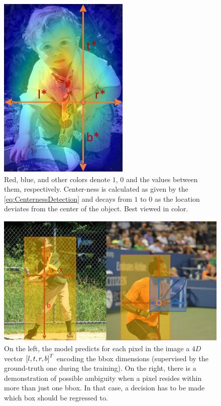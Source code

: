 \begin{figure}[t]
    \centerline{\includegraphics[width=0.25\linewidth]{figures/theoretical_foundations/fcos_centerness.pdf}}
    \caption[Centerness visualization]{Red, blue, and other colors denote $1$, $0$ and the values between them, respectively. Center-ness is calculated as given by the \cref{eq:CenternessDetection} and decays from $1$ to $0$ as the location deviates from the center of the object. Best viewed in color. }
    \label{fig:FCOSCenterness}
\end{figure}

\begin{figure}[t]
    \centerline{\includegraphics[width=0.6\linewidth]{figures/theoretical_foundations/fcos_detection_demo.pdf}}
    \caption[\Gls{fcos} predictions]{On the left, the model predicts for each pixel in the image a $4D$ vector $\left[ {l, t, r, b} \right]^T$ encoding the \gls{bbox} dimensions (supervised by the ground-truth one during the training). On the right, there is a demonstration of possible ambiguity when a pixel resides within more than just one \gls{bbox}. In that case, a decision has to be made which box should be regressed to. }
    \label{fig:FCOSDetectionDemo}
\end{figure}
